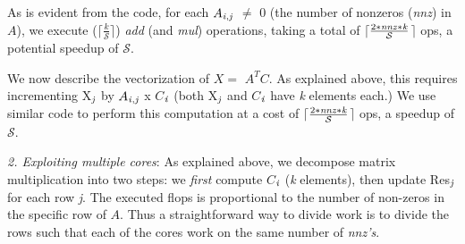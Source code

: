      \vspace*{-0.05in}
     As is evident from the code, for each
     $A_{{\it{i}},{\it{j}}}$ $\neq$ 0 (the number of nonzeros ({\it{nnz}}) in  $A$), 
     we execute ($\lceil$$\frac{k}{\mathcal{S}}$$\rceil$) 
     {\it{add}} (and {\it{mul}}) operations, taking a total of
     $\lceil$$\frac{2*{\it{nnz}}*{\it{k}}}{\mathcal{S}}$$\rceil$ ops,
     a potential speedup of $\mathcal{S}$.  

     We now describe the vectorization of  $X =$ $A^TC$. %
     As explained above, this
     requires incrementing X$_{{\it{j}}}$ 
     by $A_{{\it{i}},{\it{j}}}$ x $C$$_{{\it{i}}}$ 
     (both X$_{{\it{j}}}$ and $C$$_{{\it{i}}}$ have {\it{k}} elements each.)
     We use similar code to perform this computation at a cost of
    $\lceil$$\frac{2*{\it{nnz}}*{\it{k}}}{\mathcal{S}}$$\rceil$
    ops, a speedup of $\mathcal{S}$.

    \iffalse
    On some architectures, vector loads and stores are faster if
    memory addresses are 256-bit (or 512-bit aligned). 
    Since all our memory loads/stores start with each row of any
    matrix, we assign {\it{k}}  to be a multiple of 8, and align the
    starting addresses of all matrices to take advantage of such
    scenarios.
    \fi
    


     \vspace*{0.05in}
     {\it{2. Exploiting multiple cores}}: As explained above, we
     decompose matrix multiplication into two steps: %
     we {\it{first}} compute
     $C$$_{{\it{i}}}$ ({\it{k}} elements), then update 
     Res$_{{\it{j}}}$ for each row {\it{j}}. The %
     executed 
     flops %
     is proportional to the number of
     non-zeros in the specific row of $A$. Thus a straightforward way
     to divide work %
     is to divide the rows %
     such that each of the cores work on the same number of {\it{nnz's}}. 

